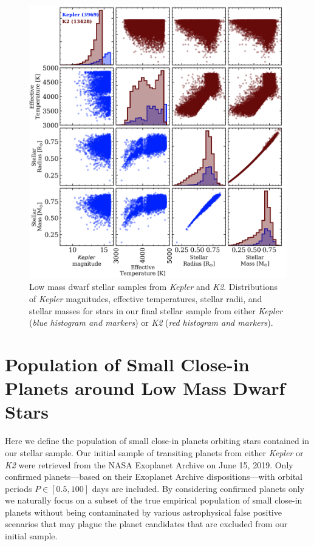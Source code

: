 \documentclass[twocolumn]{emulateapj}
\newcommand{\kepler}[1]{\emph{Kepler}#1}
\newcommand{\ktwo}[1]{\emph{K2}#1}
\begin{document}
\begin{figure}
  \centering
  \includegraphics[width=0.98\hsize]{figures/stellar_corner_KepandK2.png}
  \caption{Low mass dwarf stellar samples from \kepler{} and \ktwo{.} Distributions of \kepler{} magnitudes,
    effective temperatures, stellar radii, and stellar masses for stars in our final stellar sample from either
    \kepler{} (\emph{blue histogram and markers}) or \ktwo{} (\emph{red histogram and markers}).}
  \label{fig:stars}
\end{figure}


\section{Population of Small Close-in Planets around Low Mass Dwarf Stars} \label{sect:planets}
Here we define the population of small close-in planets orbiting stars contained in our stellar sample.
Our initial sample of transiting planets from either \kepler{} or \ktwo{} were retrieved from the
NASA Exoplanet Archive \citep{akeson13} on June 15, 2019. Only confirmed
planets---based on their Exoplanet Archive dispositions---with orbital periods
$P\in [0.5,100]$ days are included. By considering confirmed
planets only we naturally focus on a subset of the true empirical population of small close-in planets
without being contaminated by various astrophysical false positive scenarios that may plague the planet
candidates that are excluded from our initial sample.
\end{document}

